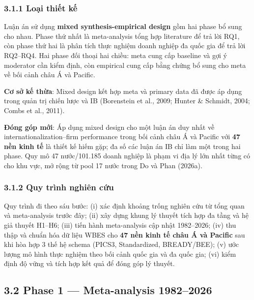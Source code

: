 \documentclass[12pt,a4paper]{article}
\begin{document}
\hypertarget{311-loux1ea1i-thiux1ebft-kux1ebf}{%
\subsubsection{3.1.1 Loại thiết
kế}\label{311-loux1ea1i-thiux1ebft-kux1ebf}}

Luận án sử dụng \textbf{mixed synthesis-empirical design} gồm hai phase
bổ sung cho nhau. Phase thứ nhất là meta-analysis tổng hợp literature để
trả lời RQ1, còn phase thứ hai là phân tích thực nghiệm doanh nghiệp đa
quốc gia để trả lời RQ2--RQ4. Hai phase đối thoại hai chiều: meta cung
cấp baseline và gợi ý moderator cần kiểm định, còn empirical cung cấp
bằng chứng bổ sung cho meta về bối cảnh châu Á và Pacific.

\textbf{Cơ sở kế thừa}: Mixed design kết hợp meta và primary data đã
được áp dụng trong quản trị chiến lược và IB (Borenstein et al., 2009;
Hunter \& Schmidt, 2004; Combs et al., 2011).

\textbf{Đóng góp mới}: Áp dụng mixed design cho một luận án duy nhất về
internationalization--firm performance trong bối cảnh châu Á và Pacific
với \textbf{47 nền kinh tế} là thiết kế hiếm gặp; đa số các luận án IB
chỉ làm một trong hai phase. Quy mô 47 nước/101.185 doanh nghiệp là phạm
vi địa lý lớn nhất từng có cho khu vực, mở rộng từ pool 17 nước trong Do
và Phan (2026a).

\hypertarget{312-quy-truxecnh-nghiuxean-cux1ee9u}{%
\subsubsection{3.1.2 Quy trình nghiên
cứu}\label{312-quy-truxecnh-nghiuxean-cux1ee9u}}

Quy trình đi theo sáu bước: (i) xác định khoảng trống nghiên cứu từ tổng
quan và meta-analysis trước đây; (ii) xây dựng khung lý thuyết tích hợp
đa tầng và hệ giả thuyết H1--H6; (iii) tiến hành meta-analysis cập nhật
1982--2026; (iv) thu thập và chuẩn hóa dữ liệu WBES cho \textbf{47 nền
kinh tế châu Á và Pacific} sau khi hòa hợp 3 thế hệ schema (PICS3,
Standardized, BREADY/BEE); (v) ước lượng mô hình thực nghiệm theo bối
cảnh quốc gia và đa quốc gia; (vi) kiểm định độ vững và tích hợp kết quả
để đóng góp lý thuyết.

\hypertarget{32-phase-1--meta-analysis-19822026}{%
\subsection{3.2 Phase 1 --- Meta-analysis
1982--2026}\label{32-phase-1--meta-analysis-19822026}}
\end{document}
